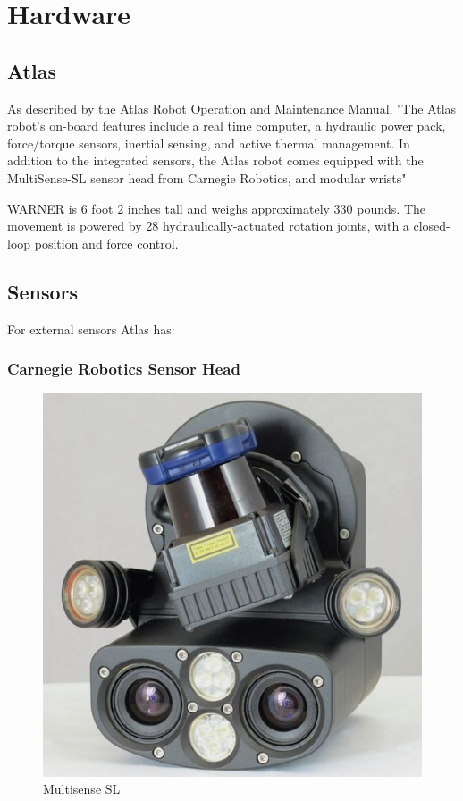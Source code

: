 \documentclass[12pt]{report}
\begin{document}
\section{Hardware}
\subsection{Atlas}

As described by the Atlas Robot Operation and Maintenance Manual, "The Atlas robot’s on-board features include a real time computer, a hydraulic power pack, force/torque sensors, inertial sensing, and active thermal management. In addition to the integrated sensors, the Atlas robot comes equipped with the MultiSense-SL sensor head from Carnegie Robotics, and modular wrists"		

WARNER is 6 foot 2 inches tall and weighs approximately 330 pounds. The movement is powered by 28 hydraulically-actuated rotation joints, with a closed-loop position and force control. 

\subsection{Sensors}

For external sensors Atlas has:

\subsubsection{Carnegie Robotics Sensor Head}
\begin{figure}
  \begin{center}
    \includegraphics[scale=0.25]{images/sensorhead.jpg}
  \end{center}
  \caption{Multisense SL}
\end{figure}
\end{document}
